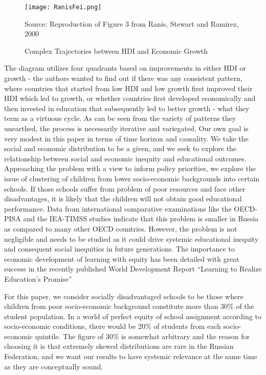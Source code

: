\documentclass[alpha-refs,fleqn]{wiley-article_p2}
\begin{document}
\begin{figure}[htbp!]
\begin{centering}
\texttt{[image: RanisFei.png]}
\end{centering}
\footnotesize{Source: Reproduction of Figure 3 from Ranis, Stewart and Ramirez, 2000}
\caption{Complex Trajectories between HDI and Economic Growth}
\end{figure}

The diagram utilizes four quadrants based on improvements in either HDI or growth - the authors wanted to find out if there was any consistent pattern, where countries that started from low HDI and low growth first improved their HDI which led to growth, or whether countries first developed economically and then invested in education that subsequently led to better growth - what they term as a virtuous cycle. As can be seen from the variety of patterns they unearthed, the process is necessarily iterative and variegated.  Our own goal is very modest in this paper in terms of time horizon and causality. We take the social and economic distribution to be a given, and we seek to explore the relationship between social and economic inequity and educational outcomes. Approaching the problem with a view to inform policy priorities, we explore the issue of clustering of children from lower socio-economic backgrounds into certain schools. If those schools suffer from problem of poor resources and face other disadvantages, it is likely that the children will not obtain good educational performance. Data from international comparative examinations like the OECD-PISA and the IEA-TIMSS studies indicate that this problem is smaller in Russia as compared to many other OECD countries. However, the problem is not negligible and needs to be studied as it could drive systemic educational inequity and consequent social inequities in future generations. The importance to economic development of learning with equity  has been detailed with great success in the recently published World Development Report ``Learning to Realize Education's Promise'' \cite{WorldBank_2018}

For this paper, we consider socially disadvantaged schools to be those where children from poor socio-economic background constitute more than 30\% of the student population. In a world of perfect equity of school assignment according to socio-economic conditions, there would be 20\% of students from each socio-economic quintile. The figure of 30\% is somewhat arbitrary and the reason for choosing it is that extremely skewed distributions are rare in the Russian Federation, and we want our results to have systemic relevance at the same time as they are conceptually sound. 
\end{document}
